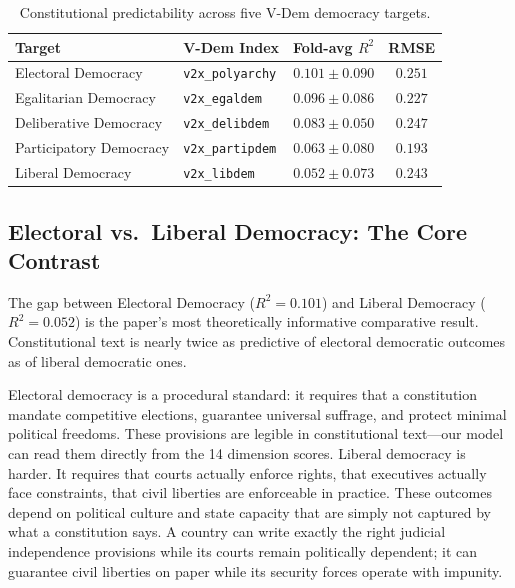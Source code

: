 \documentclass[9pt,twoside]{pnas-new}
\begin{document}
\begin{table}[t!]
\centering
\caption{Constitutional predictability across five V-Dem democracy targets.}
\label{tab:robustness}
\begin{tabular}{llcc}
\textbf{Target} & \textbf{V-Dem Index} & \textbf{Fold-avg } $R^2$ & \textbf{RMSE} \\
\midrule
Electoral Democracy     & \texttt{v2x\_polyarchy}  & $0.101 \pm 0.090$ & $0.251$ \\
Egalitarian Democracy   & \texttt{v2x\_egaldem}    & $0.096 \pm 0.086$ & $0.227$ \\
Deliberative Democracy  & \texttt{v2x\_delibdem}   & $0.083 \pm 0.050$ & $0.247$ \\
Participatory Democracy & \texttt{v2x\_partipdem}  & $0.063 \pm 0.080$ & $0.193$ \\
Liberal Democracy       & \texttt{v2x\_libdem}     & $0.052 \pm 0.073$ & $0.243$ \\
\bottomrule
\end{tabular}
\end{table}

\subsection*{Electoral vs.\ Liberal Democracy: The Core Contrast}

The gap between Electoral Democracy ($R^2 = 0.101$) and Liberal Democracy ($R^2 = 0.052$) is the paper's most theoretically informative comparative result. Constitutional text is nearly twice as predictive of electoral democratic outcomes as of liberal democratic ones.

Electoral democracy is a procedural standard: it requires that a constitution mandate competitive elections, guarantee universal suffrage, and protect minimal political freedoms. These provisions are legible in constitutional text---our model can read them directly from the 14 dimension scores. Liberal democracy is harder. It requires that courts actually enforce rights, that executives actually face constraints, that civil liberties are enforceable in practice. These outcomes depend on political culture and state capacity that are simply not captured by what a constitution says. A country can write exactly the right judicial independence provisions while its courts remain politically dependent; it can guarantee civil liberties on paper while its security forces operate with impunity.
\end{document}
